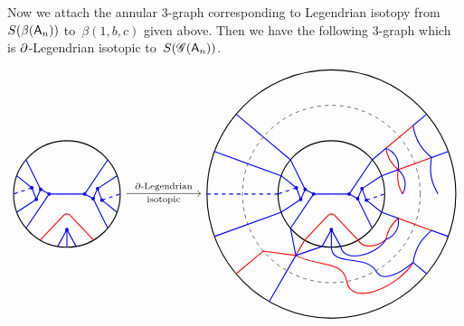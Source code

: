 Now we attach the annular $3$-graph corresponding to Legendrian isotopy from $S(\beta(\mathsf{A}_n))$ to~$\beta(1,b,c)$ given above.
Then we have the following $3$-graph which is $\partial$-Legendrian isotopic to~$S(\mathscr{G}(\mathsf{A}_n))$.
\[
\begin{tikzcd}[column sep=5pc]
\begin{tikzpicture}[baseline=-.5ex,xscale=0.5,yscale=0.5]
\draw[thick] (0,0) circle (3cm);
\foreach \i in {120,300} {
\draw[blue, thick, fill] (0,0) -- (60+\i:1) circle (2pt) -- (100+\i:3) (60+\i:1) -- (50+\i:1.5) circle (2pt) -- (20+\i:3) (50+\i:1.5) -- (70+\i:1.75) circle (2pt) -- (80+\i:3) (70+\i:1.75) -- (50+\i:2) circle (2pt) -- (40+\i:3);
\draw[blue, thick, dashed] (50+\i:2) -- (60+\i:3);
}
\draw[red, thick, rounded corners] (240:3) -- (270:1) -- (300:3);
\draw[blue, thick] (260:3) -- (270:2) -- (280:3) (270:3) -- (270:2);
\draw[blue, thick, fill] (270:2) circle (2pt);
\end{tikzpicture}
\arrow[r,"\boundary\text{-Legendrian}","\text{isotopic}"']&
\begin{tikzpicture}[baseline=-.5ex,xscale=0.5,yscale=0.5]
\draw[thick](0,0) circle (7cm) (0,0) circle (3cm);
\draw[dashed] (0,0) circle (5cm);
\foreach \i in {120,300} {
\draw[blue, thick, fill] (0,0) -- (60+\i:1) circle (2pt) -- (100+\i:3) (60+\i:1) -- (50+\i:1.5) circle (2pt) -- (20+\i:3) (50+\i:1.5) -- (70+\i:1.75) circle (2pt) -- (80+\i:3) (70+\i:1.75) -- (50+\i:2) circle (2pt) -- (40+\i:3);
\draw[blue, thick, dashed] (50+\i:2) -- (60+\i:3);
}
\draw[red, thick, rounded corners] (240:3) -- (270:1) -- (300:3);
\draw[blue, thick] (260:3) -- (270:2) -- (280:3) (270:3) -- (270:2);
\draw[blue, thick, fill] (270:2) circle (2pt);
%
\draw[red, thick] (240:3) -- (240:4) -- (220:5) -- (220:7) (240:4) to[out=330,in=100] (280:5) to[out=280,in=240] (320:6);
\draw[blue, thick] (220:3) -- (240:4) (260:3) -- (240:4) (240:4) -- (240:7);
%
\draw[blue, thick] (270:3) to[out=270,in=120] (300:5) to[out=300,in=220] (320:6) -- (320:7);
%
\draw[red, thick] (300:3) to[out=300,in=220] (320:4);
\draw[blue, thick] (280:3) to[out=280,in=240] (320:4);
%
\foreach \r in {140, 160, 200} {
\begin{scope}[rotate=\r]
\draw[blue, thick] (0:3) -- (0:7);
\end{scope}
}
\draw[blue, thick, dashed] (180:3) -- (180:7);
%
\foreach \r in {320, 0, 20} {
\begin{scope}[rotate=\r]
\draw[red, thick] (0:4) to[out=120,in=-100] (20:4) -- (20:6);
\draw[blue, thick] (0:4) to[out=60, in=-40] (20:4) -- (20:3);
\draw[blue, thick] (0:6) to[out=120,in=-100] (20:6) -- (20:7);

\end{scope}}
\end{tikzpicture}
\end{tikzcd}\]
